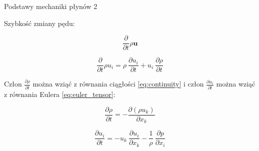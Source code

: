 \documentclass{beamer}
\begin{document}
\begin{frame}{Podstawy mechaniki płynów 2}
	
	Szybkość zmiany pędu:

	
	\begin{equation}
		\frac{\partial}{\partial t} \rho\textbf{u}
		\label{eq:vector_ped}
	\end{equation}

	
	\begin{equation}
		\frac{\partial}{\partial t}\rho u_i = \rho\ \frac{\partial u_i}{\partial t}
		+ u_i\ \frac{\partial \rho}{\partial t}
		\label{eq:ped_tensor}
	\end{equation}


	Człon $\frac{\partial\rho}{\partial t}$ można wziąć z równania ciągłości
	\eqref{eq:continuity} i człon $\frac{\partial u_i}{\partial t}$
	można wziąć z równania Eulera \eqref{eq:euler_tensor}:

	\begin{equation}
		\frac{\partial\rho}{\partial t} = -\frac{\partial(\rho u_k)}{\partial x_k}
		\label{eq:continuity_tensor}
	\end{equation}

	\begin{equation}
		\frac{\partial u_i}{\partial t} = -u_k\ \frac{\partial u_i}{\partial x_k}
		-\frac{1}{\rho}\ \frac{\partial p}{\partial x_i}
		\label{eq:euler_tensor2}
	\end{equation}


\end{frame}
\end{document}

